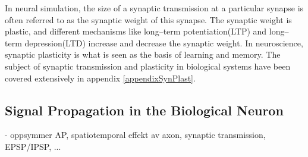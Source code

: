 		In neural simulation, the size of a synaptic transmission at a particular synapse is often referred to as the synaptic weight of this synapse.
		The synaptic weight is plastic, and different mechanisms like long--term potentiation(LTP) and long--term depression(LTD) increase and decrease the synaptic weight.
		In neuroscience, synaptic plasticity is what is seen as the basis of learning and memory\cite{NeuroscienceExploringTheBrain3edKAP25}. %
		The subject of synaptic transmission and plasticity in biological systems have been covered extensively in appendix \ref{appendixSynPlast}.

	\subsection{Signal Propagation in the Biological Neuron}
		- oppsymmer AP, spatiotemporal effekt av axon, synaptic transmission, EPSP/IPSP, ...

